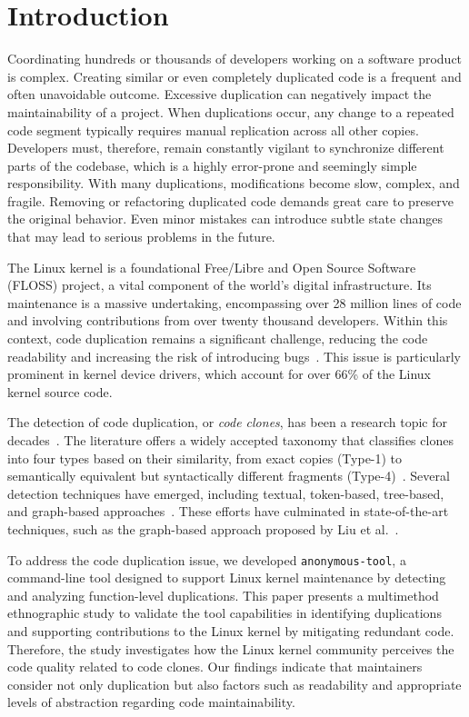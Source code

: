\documentclass[10pt,conference]{IEEEtran}
\begin{document}
\IEEEpeerreviewmaketitle

\section{Introduction}
\label{sec:introduction}

Coordinating hundreds or thousands of developers working on a software product is complex. Creating similar or even completely duplicated code is a frequent and often unavoidable outcome. Excessive duplication can negatively impact the maintainability of a project. When duplications occur, any change to a repeated code segment typically requires manual replication across all other copies. Developers must, therefore, remain constantly vigilant to synchronize different parts of the codebase, which is a highly error-prone and seemingly simple responsibility. With many duplications, modifications become slow, complex, and fragile. Removing or refactoring duplicated code demands great care to preserve the original behavior. Even minor mistakes can introduce subtle state changes that may lead to serious problems in the future.

The Linux kernel is a foundational Free/Libre and Open Source Software (FLOSS) project, a vital component of the world's digital infrastructure. Its maintenance is a massive undertaking, encompassing over 28 million lines of code and involving contributions from over twenty thousand developers. Within this context, code duplication remains a significant challenge,  reducing the code readability and increasing the risk of introducing bugs~\cite{harmone,harmtwo}. This issue is particularly prominent in kernel device drivers, which account for over 66\% of the Linux kernel source code.

The detection of code duplication, or \textit{code clones}, has been a research topic for decades~\cite{firstman}. The literature offers a widely accepted taxonomy that classifies clones into four types based on their similarity, from exact copies (Type-1) to semantically equivalent but syntactically different fragments (Type-4)~\cite{litreview}. Several detection techniques have emerged, including textual, token-based, tree-based, and graph-based approaches~\cite{litreview}. These efforts have culminated in state-of-the-art techniques, such as the graph-based approach proposed by Liu et al.~\cite{tailor}.

To address the code duplication issue, we developed \texttt{anonymous-tool}, a command-line tool designed to support Linux kernel maintenance by detecting and analyzing function-level duplications. This paper presents a multimethod ethnographic study to validate the tool capabilities in identifying duplications and supporting contributions to the Linux kernel by mitigating redundant code. Therefore, the study investigates how the Linux kernel community perceives the code quality related to code clones. Our findings indicate that maintainers consider not only duplication but also factors such as readability and appropriate levels of abstraction regarding code maintainability.
\end{document}
